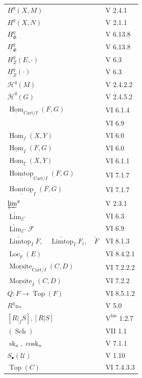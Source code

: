 \begin{longtable}{@{}p{.68\linewidth}p{.27\linewidth}@{}}
$H^q(X,M)$ & V 2.4.1\\[.7em]
$H^q(X,N)$ & V 2.1.1\\
$H^q_{\Phi}$ & V 6.13.8\\
$\underline H^{q}_{\Phi}$ & V 6.13.8\\
$H^q_Z(E,\mathord\cdot)$ & V 6.3\\
$\underline H^{q}_Z(\mathord\cdot)$ & V 6.3\\
$\mathcal H^{q}(M)$ & V 2.4.2.2\\
$\check{\mathcal H}^{q}(G)$ & V 2.4.5.2\\
$\underline{\operatorname{Hom}}_{\mathrm{Cart}/I}(F,G)$ & VI 6.1.4\\
& VI 6.9\\
$\operatorname{Hom}_f(X,Y)$ & VI 6.0\\
$\underline{\operatorname{Hom}}_I(F,G)$ & VI 6.0\\
$\operatorname{Hom}_{\xi}(X,Y)$ & VI 6.1.1\\
$\underline{\operatorname{Homtop}}_{\mathrm{Cart}/I}(F,G)$ & VI 7.1.7\\
$\underline{\operatorname{Homtop}}_I(F,G)$ & VI 7.1.7\\
${\varprojlim}^{q}$ & V 2.3.1\\
$\underrightarrow{\operatorname{Lim}}_{\mathcal E^{\circ}}$ & VI 6.3\\
$\underleftarrow{\operatorname{Lim}}_{\mathcal E^{\circ}}\mathcal F$ & VI 6.9\\
$\underleftarrow{\operatorname{Limtop}}_I F,\quad\underleftarrow{\operatorname{Limtop}}_I F_i,\quad\underleftarrow F$ & VI 8.1.3\\
$\operatorname{Loc}_p(E)$ & VI 8.4.2.1\\
$\underline{\operatorname{Morsite}}_{\mathrm{Cart}/I}(C,D)$ & VI 7.2.2.2\\
$\underline{\operatorname{Morsite}}_I(C,D)$ & VI 7.2.2\\
$Q:F\to\operatorname{Top}(F)$ & VI 8.5.1.2\\
$R^q u_*$ & V 5.0\\
$[R|_fS],[R|S]$ & $\mathrm{V}^{\mathrm{bis}}$ 1.2.7\\
$(\operatorname{Sch})$ & VII 1.1\\
$\operatorname{sk}_n,\operatorname{cosk}_n$ & V 7.1.1\\
$S_{\bullet}(\mathcal U)$ & V 1.10\\
$\operatorname{Top}(C)$ & VI 7.4.3.3\\[.7em]

\end{longtable}
